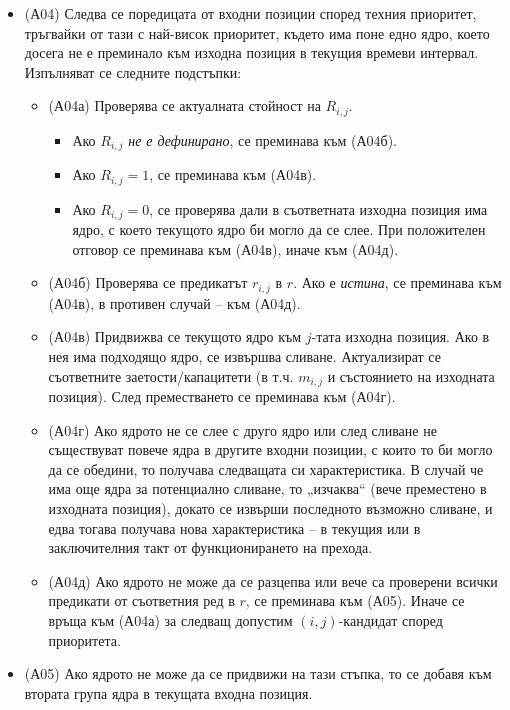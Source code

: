 \begin{itemize}
\item (А04) Следва се поредицата от входни позиции според техния приоритет, тръгвайки от тази с най-висок приоритет, където има поне едно ядро, което досега не е преминало към изходна позиция в текущия времеви интервал. Изпълняват се следните подстъпки:
  \begin{itemize}[itemsep=0.5em]
    \item (А04а) Проверява се актуалната стойност на $R_{i,j}$.
      \begin{itemize}
        \item Ако $R_{i,j}$ \emph{не е дефинирано}, се преминава към (А04б).
        \item Ако $R_{i,j}=1$, се преминава към (А04в).
        \item Ако $R_{i,j}=0$, се проверява дали в съответната изходна позиция има ядро, с което текущото ядро би могло да се слее. При положителен отговор се преминава към (А04в), иначе към (А04д).
      \end{itemize}
    \item (А04б) Проверява се предикатът $r_{i,j}$ в $r$. Ако е \emph{истина}, се преминава към (А04в), в противен случай -- към (А04д).
    \item (А04в) Придвижва се текущото ядро към $j$-тата изходна позиция. Ако в нея има подходящо ядро, се извършва сливане. Актуализират се съответните заетости/капацитети (в т.ч. $m_{i,j}$ и състоянието на изходната позиция). След преместването се преминава към (А04г).
    \item (А04г) Ако ядрото не се слее с друго ядро или след сливане не съществуват повече ядра в другите входни позиции, с които то би могло да се обедини, то получава следващата си характеристика. В случай че има още ядра за потенциално сливане, то „изчаква“ (вече преместено в изходната позиция), докато се извърши последното възможно сливане, и едва тогава получава нова характеристика -- в текущия или в заключителния такт от функционирането на прехода.
    \item (А04д) Ако ядрото не може да се разцепва или вече са проверени всички предикати от съответния ред в $r$, се преминава към (А05). Иначе се връща към (А04а) за следващ допустим $(i,j)$-кандидат според приоритета.
  \end{itemize}


  \item (А05) Ако ядрото не може да се придвижи на тази стъпка, то се добавя към втората група 
  ядра в текущата входна позиция.


\end{itemize}
